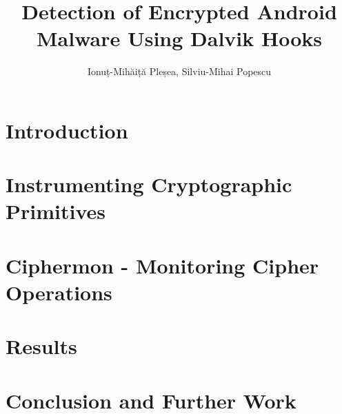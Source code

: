\documentclass{llncs}
\begin{document}
\title{Detection of Encrypted Android Malware Using Dalvik Hooks}


\author{Ionuț-Mihăiță Pleșea, Silviu-Mihai Popescu}

\maketitle


\begin{abstract}
  
\end{abstract}



\section{Introduction}
\label{sec:intro}


\section{Instrumenting Cryptographic Primitives}
\label{sec:design}


\section{Ciphermon - Monitoring Cipher Operations}
\label{sec:implementation}


\section{Results}
\label{sec:results}


\section{Conclusion and Further Work}
\label{sec:conclusion}




\end{document}
